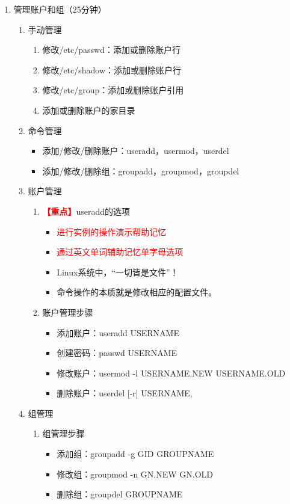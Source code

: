 \documentclass{TIJMUjiaoanLL}
\begin{document}
\begin{enumerate}
  \item 管理账户和组（25分钟）
    \begin{enumerate}
      \item 手动管理
	\begin{enumerate}
          \item 修改/etc/passwd：添加或删除账户行
          \item 修改/etc/shadow：添加或删除账户行
          \item 修改/etc/group：添加或删除账户引用
          \item 添加或删除账户的家目录
	\end{enumerate}
      \item 命令管理
	\begin{itemize}
	  \item 添加/修改/删除账户：useradd，usermod，userdel
	  \item 添加/修改/删除组：groupadd，groupmod，groupdel
	\end{itemize}
      \item 账户管理
	\begin{enumerate}
	  \item \textcolor{red}{\textbf{【重点】}}useradd的选项
	    \begin{itemize}
	      \item \textcolor{red}{进行实例的操作演示帮助记忆}
	      \item \textcolor{red}{通过英文单词辅助记忆单字母选项}
	      \item Linux系统中，“一切皆是文件”！
	      \item 命令操作的本质就是修改相应的配置文件。
	    \end{itemize}

	  \item 账户管理步骤
	    \begin{itemize}
	      \item 添加账户：useradd USERNAME
	      \item 创建密码：passwd USERNAME
	      \item 修改账户：usermod -l USERNAME.NEW USERNAME.OLD
	      \item 删除账户：userdel [-r] USERNAME,
	    \end{itemize}
	\end{enumerate}
      \item 组管理
	\begin{enumerate}
	  \item 组管理步骤
	    \begin{itemize}
	      \item 添加组：groupadd -g GID GROUPNAME
	      \item 修改组：groupmod -n GN.NEW GN.OLD
	      \item 删除组：groupdel GROUPNAME
	    \end{itemize}
	\end{enumerate}
    \end{enumerate}


\end{enumerate}
\end{document}
